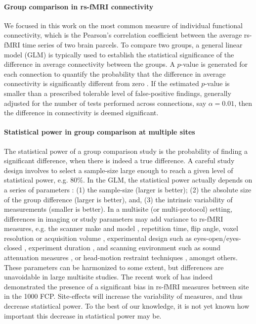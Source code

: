 \documentclass[authoryear]{elsarticle}
\begin{document}
\paragraph{Group comparison in rs-fMRI connectivity}
We focused in this work on the most common measure of individual functional connectivity, which is the Pearson's correlation coefficient between the average rs-fMRI time series of two brain parcels. To compare two groups, a general linear model (GLM) is typically used to establish the statistical significance of the difference in average connectivity between the groups. A $p$-value is generated for each connection to quantify the probability that the difference in average connectivity is significantly different from zero \citep{Worsley1995}. If the estimated $p$-value is smaller than a prescribed tolerable level of false-positive findings, generally adjusted for the number of tests performed across connections, say $\alpha=0.01$, then the difference in connectivity is deemed significant. 

\paragraph{Statistical power in group comparison at multiple sites}
The statistical power of a group comparison study is the probability of finding a significant difference, when there is indeed a true difference. A careful study design involves to select a sample-size large enough to reach a given level of statistical power, e.g. 80\%. In the GLM, the statistical power actually depends on a series of parameters \citep{Desmond2002}: (1) the sample-size (larger is better); (2) the absolute size of the group difference (larger is better), and, (3) the intrinsic variability of measurements (smaller is better). 
In a multisite (or multi-protocol) setting, differences in imaging or study parameters may add variance to rs-fMRI measures, e.g. the scanner make and model \citep{Friedman2006}, repetition time, flip angle, voxel resolution or acquisition volume \citep{Friedman2006a}, experimental design such as eyes-open/eyes-closed \citep{Yan2009}, experiment duration \citep{VanDijk2010}, and scanning environment such as sound attenuation measures \citep{Elliott1999}, or head-motion restraint techniques \citep{Edward2000}, amongst others. These parameters can be harmonized to some extent, but differences are unavoidable in large multisite studies. The recent work of \cite{Yan2013h} has indeed demonstrated the presence of a significant bias in rs-fMRI measures between site in the 1000 FCP. Site-effects will increase the variability of measures, and thus decrease statistical power. To the best of our knowledge, it is not yet known how important this decrease in statistical power may be. 
\end{document}
